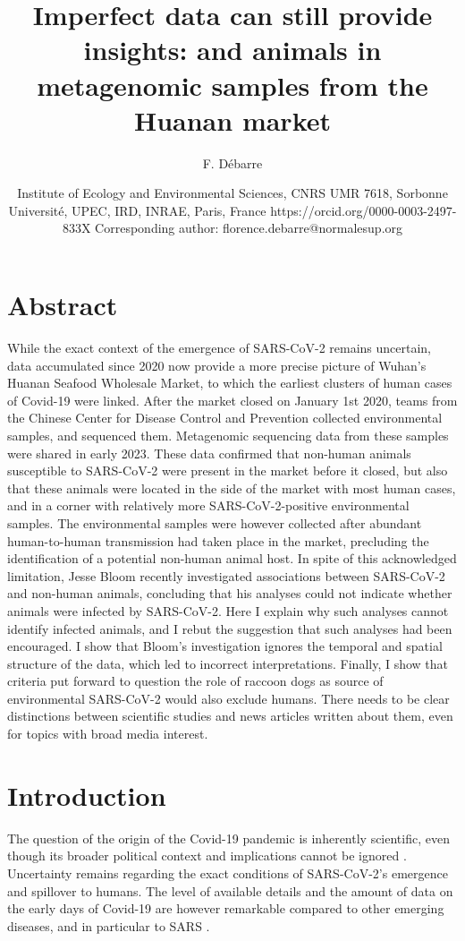 \documentclass[11pt]{article}
\title{Imperfect data can still provide insights: \sct{} and animals in metagenomic samples from the Huanan market}
\author{F. D\'ebarre}
\date{Institute of Ecology and Environmental Sciences, CNRS UMR 7618, Sorbonne Université, UPEC, IRD, INRAE, Paris, France \newline https://orcid.org/0000-0003-2497-833X \newline Corresponding author: florence.debarre@normalesup.org}
\def \sct {\mbox{SARS-CoV-2}}
\begin{document}
\maketitle

\linenumbers


\section*{Abstract}
While the exact context of the emergence of \sct{} remains uncertain, data accumulated since 2020 now provide a more precise picture of Wuhan’s Huanan Seafood Wholesale Market, to which the earliest clusters of human cases of Covid-19 were linked. After the market closed on January 1st 2020, teams from the Chinese Center for Disease Control and Prevention collected environmental samples, and sequenced them. Metagenomic sequencing data from these samples were shared in early 2023. These data confirmed that non-human animals susceptible to \sct{} were present in the market before it closed, but also that these animals were located in the side of the market with most human cases, and in a corner with relatively more \sct{}-positive environmental samples. The environmental samples were however collected after abundant human-to-human transmission had taken place in the market, precluding the identification of a potential non-human animal host. In spite of this acknowledged limitation, Jesse Bloom recently investigated associations between \sct{} and non-human animals, concluding that his analyses could not indicate whether animals were infected by \sct. Here I explain why such analyses cannot identify infected animals, and I rebut the suggestion that such analyses had been encouraged. I show that Bloom’s investigation ignores the temporal and spatial structure of the data, which led to incorrect interpretations. Finally, I show that criteria put forward to question the role of raccoon dogs as source of environmental \sct{} would also exclude humans. There needs to be clear distinctions between scientific studies and news articles written about them, even for topics with broad media interest. 

\section{Introduction}

The question of the origin of the Covid-19 pandemic is inherently scientific, even though its broader political context and implications cannot be ignored \citep{GostinGronvall2023NEJM}. Uncertainty remains regarding the exact conditions of \sct{}’s emergence and spillover to humans. The level of available details and the amount of data on the early days of Covid-19 are however remarkable compared to other emerging diseases, and in particular to SARS \citep{Xu2004EID, Keusch2022PNAS}.
\end{document}
